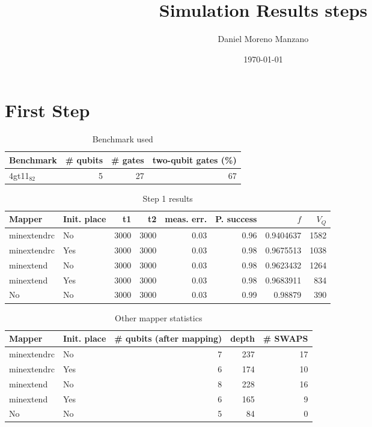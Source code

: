 \documentclass[11pt]{article}
\author{Daniel Moreno Manzano}
\date{\today}
\title{Simulation Results steps}
\begin{document}
\maketitle


\section{First Step}
\label{sec:org82834cf}

\begin{table}[htbp]
\caption{\label{tab:org70aefb9}
Benchmark used}
\centering
\begin{tabular}{lrrr}
\hline
Benchmark & \# qubits & \# gates & two-qubit gates (\%)\\
\hline
4gt11\(_{\text{82}}\) & 5 & 27 & 67\\
\hline
\end{tabular}
\end{table}

\begin{table}[htbp]
\caption{\label{tab:orgdde61df}
Step 1 results}
\centering
\begin{tabular}{llrrrrrr}
\hline
Mapper & Init. place & t1 & t2 & meas. err. & P. success & \(f\) & \(V_Q\)\\
\hline
minextendrc & No & 3000 & 3000 & 0.03 & 0.96 & 0.9404637 & 1582\\
minextendrc & Yes & 3000 & 3000 & 0.03 & 0.98 & 0.9675513 & 1038\\
\hline
minextend & No & 3000 & 3000 & 0.03 & 0.98 & 0.9623432 & 1264\\
minextend & Yes & 3000 & 3000 & 0.03 & 0.98 & 0.9683911 & 834\\
No & No & 3000 & 3000 & 0.03 & 0.99 & 0.98879 & 390\\
\hline
\end{tabular}
\end{table}

\begin{table}[htbp]
\caption{\label{tab:orgcb4bc81}
Other mapper statistics}
\centering
\begin{tabular}{llrrr}
\hline
Mapper & Init. place & \# qubits (after mapping) & depth & \# SWAPS\\
\hline
minextendrc & No & 7 & 237 & 17\\
minextendrc & Yes & 6 & 174 & 10\\
\hline
minextend & No & 8 & 228 & 16\\
minextend & Yes & 6 & 165 & 9\\
No & No & 5 & 84 & 0\\
\hline
\end{tabular}
\end{table}
\end{document}
